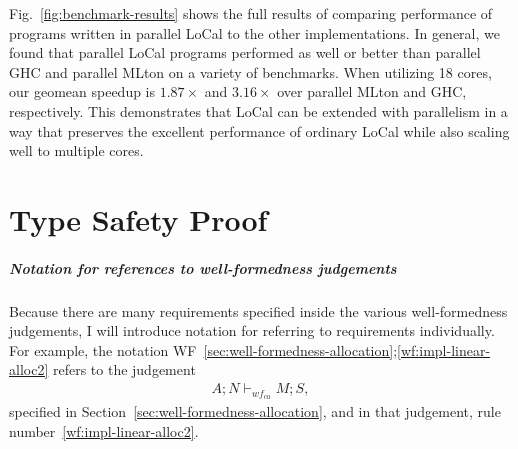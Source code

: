 \documentclass[showabstract,showacknowledgments,showpreface,showdedication,school]{iuphd}
\theoremstyle{nonumberplain}
\newcommand{\sysname}[0]{LoCal\xspace}
\newcommand{\ourcalc}[0]{\sysname}
\newcommand{\keywd}[1]{\mathit{#1}}
\newcommand{\STOR}{\keywd{S}}
\newcommand{\MENV}{\keywd{M}}
\newcommand{\AENV}{\keywd{A}}
\newcommand{\NENV}{\keywd{N}}
\newcommand{\storewfca}[4]{\ensuremath{#1;#2 \vdash_{wf_{ca}} #3;#4}}
\newcommand{\refwellformed}[2]{WF~\ref{#1};\ref{#2}}
\newcommand{\Figref}[1]{Fig.~\ref{#1}}
\begin{document}
\Figref{fig:benchmark-results} shows the full results of comparing performance
of programs written in parallel \ourcalc{} to the other implementations. In
general, we found that parallel \ourcalc{} programs performed as well or better
than parallel GHC and parallel MLton on a variety of benchmarks. When utilizing
18 cores, our geomean speedup is $1.87\times$ and $3.16\times$ over parallel
MLton and GHC, respectively.
This demonstrates that \ourcalc{} can be extended with
parallelism in a way that preserves the excellent performance of
ordinary \ourcalc{} while also scaling well to multiple cores.





\appendix



\chapter{Type Safety Proof}\label{appendix:proof}

\paragraph{Notation for references to well-formedness judgements}
Because there are many requirements specified inside the various
well-formedness judgements, I will introduce notation for referring
to requirements individually.
For example, the notation
\refwellformed{sec:well-formedness-allocation}{wf:impl-linear-alloc2}
refers to the judgement
\begin{align*}
\storewfca{\AENV}{\NENV}{\MENV}{\STOR},
\end{align*}
specified in Section~\ref{sec:well-formedness-allocation},
and in that judgement, rule number~\ref{wf:impl-linear-alloc2}.
\end{document}
